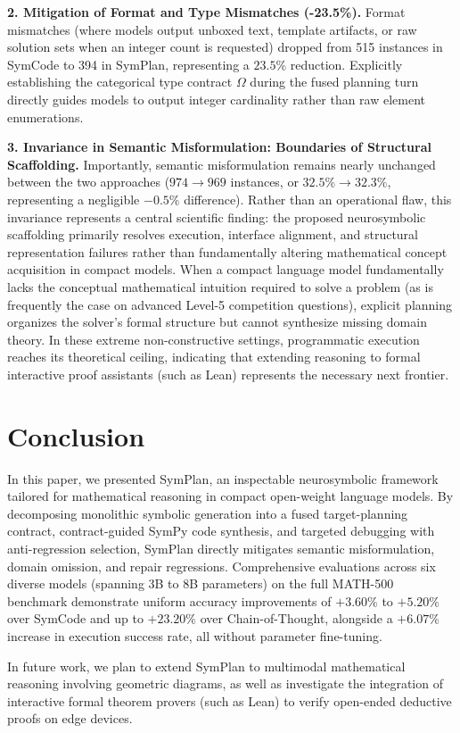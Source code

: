 \documentclass[runningheads]{llncs}
\begin{document}
\textbf{2. Mitigation of Format and Type Mismatches (-23.5\%).} Format mismatches (where models output unboxed text, template artifacts, or raw solution sets when an integer count is requested) dropped from 515 instances in SymCode to 394 in SymPlan, representing a $23.5\%$ reduction. Explicitly establishing the categorical type contract $\Omega$ during the fused planning turn directly guides models to output integer cardinality rather than raw element enumerations.

\textbf{3. Invariance in Semantic Misformulation: Boundaries of Structural Scaffolding.} Importantly, semantic misformulation remains nearly unchanged between the two approaches ($974 \to 969$ instances, or $32.5\% \to 32.3\%$, representing a negligible $-0.5\%$ difference). Rather than an operational flaw, this invariance represents a central scientific finding: the proposed neurosymbolic scaffolding primarily resolves execution, interface alignment, and structural representation failures rather than fundamentally altering mathematical concept acquisition in compact models. When a compact language model fundamentally lacks the conceptual mathematical intuition required to solve a problem (as is frequently the case on advanced Level-5 competition questions), explicit planning organizes the solver's formal structure but cannot synthesize missing domain theory. In these extreme non-constructive settings, programmatic execution reaches its theoretical ceiling, indicating that extending reasoning to formal interactive proof assistants (such as Lean) represents the necessary next frontier.

\section{Conclusion}

In this paper, we presented SymPlan, an inspectable neurosymbolic framework tailored for mathematical reasoning in compact open-weight language models. By decomposing monolithic symbolic generation into a fused target-planning contract, contract-guided SymPy code synthesis, and targeted debugging with anti-regression selection, SymPlan directly mitigates semantic misformulation, domain omission, and repair regressions. Comprehensive evaluations across six diverse models (spanning 3B to 8B parameters) on the full MATH-500 benchmark demonstrate uniform accuracy improvements of $+3.60\%$ to $+5.20\%$ over SymCode and up to $+23.20\%$ over Chain-of-Thought, alongside a $+6.07\%$ increase in execution success rate, all without parameter fine-tuning.

In future work, we plan to extend SymPlan to multimodal mathematical reasoning involving geometric diagrams, as well as investigate the integration of interactive formal theorem provers (such as Lean) to verify open-ended deductive proofs on edge devices.



\end{document}
